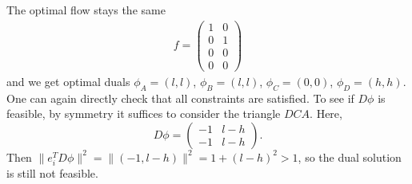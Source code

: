 \documentclass[10pt,a4paper]{article}
\begin{document}
The optimal flow stays the same
\begin{align*}
f = \begin{pmatrix}
1&0\\0&1\\0&0\\0&0
\end{pmatrix}
\end{align*}
and we get optimal duals $\phi_A = (l,l)$, $\phi_B = (l,l)$, $\phi_C = (0,0)$, $\phi_D = (h,h)$. One can again directly check that all constraints are satisfied. To see if $D\phi$ is feasible, by symmetry it suffices to consider the triangle $DCA$. Here,
\[
D\phi = \begin{pmatrix}
-1&l-h\\-1&l-h
\end{pmatrix}.
\]
Then $\lVert e_i^T D\phi \rVert^2 = \lVert (-1,l-h) \rVert^2 = 1 + (l-h)^2 > 1$, so the dual solution is still not feasible.
\end{document}
